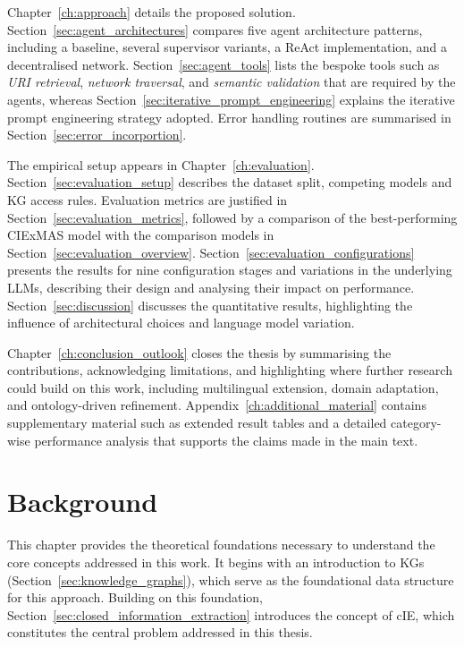 \documentclass[a4paper,oneside,bibliography=totoc]{scrbook}
\begin{document}
Chapter~\ref{ch:approach} details the proposed solution. Section~\ref{sec:agent_architectures} compares five agent architecture patterns, including a baseline, several supervisor variants, a ReAct implementation, and a decentralised network. Section~\ref{sec:agent_tools} lists the bespoke tools such as \textit{\ac{URI} retrieval}, \textit{network traversal}, and \textit{semantic validation} that are required by the agents, whereas Section~\ref{sec:iterative_prompt_engineering} explains the iterative prompt engineering strategy adopted. Error handling routines are summarised in Section~\ref{sec:error_incorportion}.

The empirical setup appears in Chapter~\ref{ch:evaluation}. Section~\ref{sec:evaluation_setup} describes the dataset split, competing models and \ac{KG} access rules. Evaluation metrics are justified in Section~\ref{sec:evaluation_metrics}, followed by a comparison of the best-performing CIExMAS model with the comparison models in Section~\ref{sec:evaluation_overview}. Section~\ref{sec:evaluation_configurations} presents the results for nine configuration stages and variations in the underlying \acp{LLM}, describing their design and analysing their impact on performance. Section~\ref{sec:discussion} discusses the quantitative results, highlighting the influence of architectural choices and language model variation.

Chapter~\ref{ch:conclusion_outlook} closes the thesis by summarising the contributions, acknowledging limitations, and highlighting where further research could build on this work, including multilingual extension, domain adaptation, and ontology-driven refinement. Appendix~\ref{ch:additional_material} contains supplementary material such as extended result tables and a detailed category-wise performance analysis that supports the claims made in the main text.

\chapter{Background}
\label{ch:background}

This chapter provides the theoretical foundations necessary to understand the core concepts addressed in this work. It begins with an introduction to \acp{KG} (Section~\ref{sec:knowledge_graphs}), which serve as the foundational data structure for this approach. Building on this foundation, Section~\ref{sec:closed_information_extraction} introduces the concept of \ac{cIE}, which constitutes the central problem addressed in this thesis.
\end{document}
